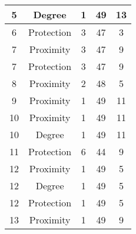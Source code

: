 \documentclass[results.tex]{subfiles}
\begin{document}
\begin{center}
\begin{tabular}{| c || c | c | c | c |}
            \hline
            5                       & Degree                       & 1                      & 49                      & 13                   \\
            \hline
            6                       & Protection                   & 3                      & 47                      & 3                    \\
            \hline
            7                       & Proximity                    & 3                      & 47                      & 9                    \\
            \hline
            7                       & Protection                   & 3                      & 47                      & 9                    \\
            \hline
            8                       & Proximity                    & 2                      & 48                      & 5                    \\
            \hline
            9                       & Proximity                    & 1                      & 49                      & 11                   \\
            \hline
            10                      & Proximity                    & 1                      & 49                      & 11                   \\
            \hline
            10                      & Degree                       & 1                      & 49                      & 11                   \\
            \hline
            11                      & Protection                   & 6                      & 44                      & 9                    \\
            \hline
            12                      & Proximity                    & 1                      & 49                      & 5                    \\
            \hline
            12                      & Degree                       & 1                      & 49                      & 5                    \\
            \hline
            12                      & Protection                   & 1                      & 49                      & 5                    \\
            \hline
            13                      & Proximity                    & 1                      & 49                      & 9                    \\

\end{tabular}
\end{center}
\end{document}
